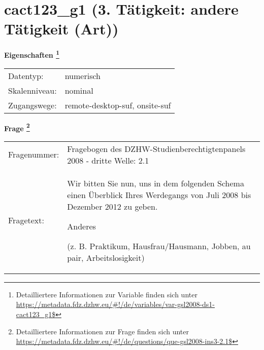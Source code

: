 
    \setcounter{footnote}{0}

    \vspace*{-1.8cm}
	\section{cact123\_g1 (3. Tätigkeit: andere Tätigkeit (Art))}
	\label{section:cact123_g1}



    \vspace*{0.5cm}
    \noindent\textbf{Eigenschaften
	\footnote{Detailliertere Informationen zur Variable finden sich unter
		\url{https://metadata.fdz.dzhw.eu/\#!/de/variables/var-gsl2008-ds1-cact123_g1$}}}\\
	\begin{tabularx}{\hsize}{@{}lX}
	Datentyp: & numerisch \\
	Skalenniveau: & nominal \\
	Zugangswege: &
	  remote-desktop-suf, 
	  onsite-suf
 \\
    \end{tabularx}



				\vspace*{0.5cm}
                \noindent\textbf{Frage
	                \footnote{Detailliertere Informationen zur Frage finden sich unter
		              \url{https://metadata.fdz.dzhw.eu/\#!/de/questions/que-gsl2008-ins3-2.1$}}}\\
				\begin{tabularx}{\hsize}{@{}lX}
					Fragenummer: &
					  Fragebogen des DZHW-Studienberechtigtenpanels 2008 - dritte Welle:
					  2.1
 \\
					Fragetext: & Wir bitten Sie nun, uns in dem folgenden Schema einen Überblick Ihres Werdegangs von Juli 2008 bis Dezember 2012 zu geben.\par  Anderes\par  (z. B. Praktikum, Hausfrau/Hausmann, Jobben, au pair, Arbeitslosigkeit) \\
				\end{tabularx}





